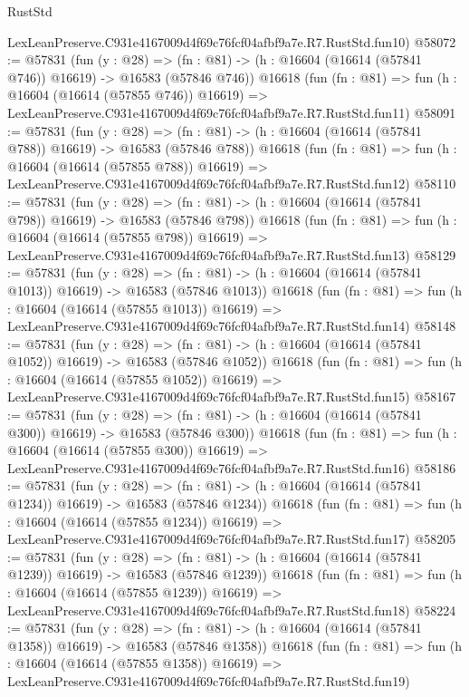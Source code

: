 \begin{lexlean}{RustStd}
\begin{coremodule}
    LexLeanPreserve.C931e4167009d4f69c76fcf04afbf9a7e.R7.RustStd.fun10)
@58072 := @57831
    (fun (y : @28) =>
    (fn : @81) -> (h : @16604 (@16614 (@57841 @746)) @16619) -> @16583 (@57846 @746))
    @16618
    (fun (fn : @81) =>
    fun (h : @16604 (@16614 (@57855 @746)) @16619) =>
    LexLeanPreserve.C931e4167009d4f69c76fcf04afbf9a7e.R7.RustStd.fun11)
@58091 := @57831
    (fun (y : @28) =>
    (fn : @81) -> (h : @16604 (@16614 (@57841 @788)) @16619) -> @16583 (@57846 @788))
    @16618
    (fun (fn : @81) =>
    fun (h : @16604 (@16614 (@57855 @788)) @16619) =>
    LexLeanPreserve.C931e4167009d4f69c76fcf04afbf9a7e.R7.RustStd.fun12)
@58110 := @57831
    (fun (y : @28) =>
    (fn : @81) -> (h : @16604 (@16614 (@57841 @798)) @16619) -> @16583 (@57846 @798))
    @16618
    (fun (fn : @81) =>
    fun (h : @16604 (@16614 (@57855 @798)) @16619) =>
    LexLeanPreserve.C931e4167009d4f69c76fcf04afbf9a7e.R7.RustStd.fun13)
@58129 := @57831
    (fun (y : @28) =>
    (fn : @81) -> (h : @16604 (@16614 (@57841 @1013)) @16619) -> @16583 (@57846 @1013))
    @16618
    (fun (fn : @81) =>
    fun (h : @16604 (@16614 (@57855 @1013)) @16619) =>
    LexLeanPreserve.C931e4167009d4f69c76fcf04afbf9a7e.R7.RustStd.fun14)
@58148 := @57831
    (fun (y : @28) =>
    (fn : @81) -> (h : @16604 (@16614 (@57841 @1052)) @16619) -> @16583 (@57846 @1052))
    @16618
    (fun (fn : @81) =>
    fun (h : @16604 (@16614 (@57855 @1052)) @16619) =>
    LexLeanPreserve.C931e4167009d4f69c76fcf04afbf9a7e.R7.RustStd.fun15)
@58167 := @57831
    (fun (y : @28) =>
    (fn : @81) -> (h : @16604 (@16614 (@57841 @300)) @16619) -> @16583 (@57846 @300))
    @16618
    (fun (fn : @81) =>
    fun (h : @16604 (@16614 (@57855 @300)) @16619) =>
    LexLeanPreserve.C931e4167009d4f69c76fcf04afbf9a7e.R7.RustStd.fun16)
@58186 := @57831
    (fun (y : @28) =>
    (fn : @81) -> (h : @16604 (@16614 (@57841 @1234)) @16619) -> @16583 (@57846 @1234))
    @16618
    (fun (fn : @81) =>
    fun (h : @16604 (@16614 (@57855 @1234)) @16619) =>
    LexLeanPreserve.C931e4167009d4f69c76fcf04afbf9a7e.R7.RustStd.fun17)
@58205 := @57831
    (fun (y : @28) =>
    (fn : @81) -> (h : @16604 (@16614 (@57841 @1239)) @16619) -> @16583 (@57846 @1239))
    @16618
    (fun (fn : @81) =>
    fun (h : @16604 (@16614 (@57855 @1239)) @16619) =>
    LexLeanPreserve.C931e4167009d4f69c76fcf04afbf9a7e.R7.RustStd.fun18)
@58224 := @57831
    (fun (y : @28) =>
    (fn : @81) -> (h : @16604 (@16614 (@57841 @1358)) @16619) -> @16583 (@57846 @1358))
    @16618
    (fun (fn : @81) =>
    fun (h : @16604 (@16614 (@57855 @1358)) @16619) =>
    LexLeanPreserve.C931e4167009d4f69c76fcf04afbf9a7e.R7.RustStd.fun19)

\end{coremodule}
\end{lexlean}
